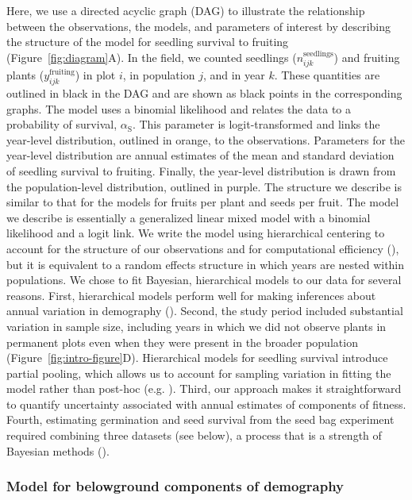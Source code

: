 \documentclass[12pt, oneside, titlepage]{article}   	%
\begin{document}
Here, we use a directed acyclic graph (DAG) to illustrate the relationship between the observations, the models, and parameters of interest by describing the structure of the model for seedling survival to fruiting (Figure~\ref{fig:diagram}A). In the field, we counted seedlings ($n^\mathrm{seedlings}_{ijk}$) and fruiting plants ($y^\mathrm{fruiting}_{ijk}$) in plot $i$, in population $j$, and in year $k$. These quantities are outlined in black in the DAG and are shown as black points in the corresponding graphs. The model uses a binomial likelihood and relates the data to a probability of survival, $\alpha_\mathrm{S}$. This parameter is logit-transformed and links the year-level distribution, outlined in orange, to the observations. Parameters for the year-level distribution are annual estimates of the mean and standard deviation of seedling survival to fruiting. Finally, the year-level distribution is drawn from the population-level distribution, outlined in purple. The structure we describe is similar to that for the models for fruits per plant and seeds per fruit. 
The model we describe is essentially a generalized linear mixed model with a binomial likelihood and a logit link. We write the model using hierarchical centering to account for the structure of our observations and for computational efficiency (\cite{evans2010,ogle2020}), but it is equivalent to a random effects structure in which years are nested within populations. We chose to fit Bayesian, hierarchical models to our data for several reasons. First, hierarchical models perform well for making inferences about annual variation in demography (\cite{metcalf2015}). Second, the study period included substantial variation in sample size, including years in which we did not observe plants in permanent plots even when they were present in the broader population (Figure~\ref{fig:intro-figure}D). Hierarchical models for seedling survival introduce partial pooling, which allows us to account for sampling variation in fitting the model rather than post-hoc (e.g. \cite{evans2007}). Third, our approach makes it straightforward to quantify uncertainty associated with annual estimates of components of fitness. Fourth, estimating germination and seed survival from the seed bag experiment required combining three datasets (see below), a process that is a strength of Bayesian methods (\cite{hobbs2015b}). 

\subsubsection{Model for belowground components of demography}
\end{document}
